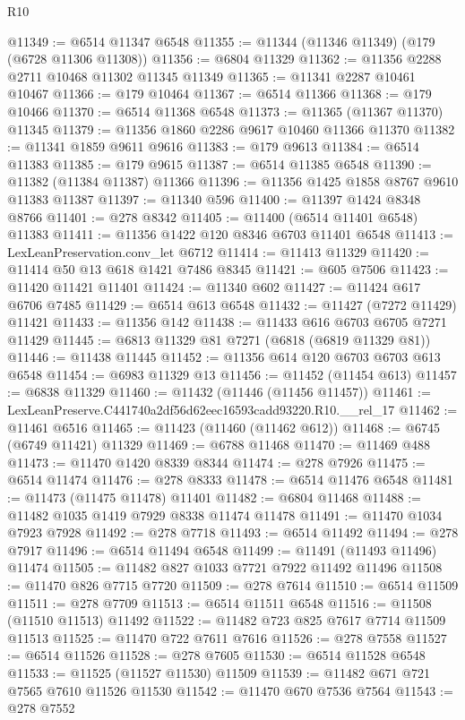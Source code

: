 \begin{lexlean}{R10}
\begin{coremodule}
@11349 := @6514 @11347 @6548
@11355 := @11344 (@11346 @11349) (@179 (@6728 @11306 @11308))
@11356 := @6804 @11329
@11362 := @11356 @2288 @2711 @10468 @11302 @11345 @11349
@11365 := @11341 @2287 @10461 @10467
@11366 := @179 @10464
@11367 := @6514 @11366
@11368 := @179 @10466
@11370 := @6514 @11368 @6548
@11373 := @11365 (@11367 @11370) @11345
@11379 := @11356 @1860 @2286 @9617 @10460 @11366 @11370
@11382 := @11341 @1859 @9611 @9616
@11383 := @179 @9613
@11384 := @6514 @11383
@11385 := @179 @9615
@11387 := @6514 @11385 @6548
@11390 := @11382 (@11384 @11387) @11366
@11396 := @11356 @1425 @1858 @8767 @9610 @11383 @11387
@11397 := @11340 @596
@11400 := @11397 @1424 @8348 @8766
@11401 := @278 @8342
@11405 := @11400 (@6514 @11401 @6548) @11383
@11411 := @11356 @1422 @120 @8346 @6703 @11401 @6548
@11413 := LexLeanPreservation.conv_let @6712
@11414 := @11413 @11329
@11420 := @11414 @50 @13 @618 @1421 @7486 @8345
@11421 := @605 @7506
@11423 := @11420 @11421 @11401
@11424 := @11340 @602
@11427 := @11424 @617 @6706 @7485
@11429 := @6514 @613 @6548
@11432 := @11427 (@7272 @11429) @11421
@11433 := @11356 @142
@11438 := @11433 @616 @6703 @6705 @7271 @11429
@11445 := @6813 @11329 @81 @7271 (@6818 (@6819 @11329 @81))
@11446 := @11438 @11445
@11452 := @11356 @614 @120 @6703 @6703 @613 @6548
@11454 := @6983 @11329 @13
@11456 := @11452 (@11454 @613)
@11457 := @6838 @11329
@11460 := @11432 (@11446 (@11456 @11457))
@11461 := LexLeanPreserve.C441740a2df56d62eec16593cadd93220.R10.__rel_17
@11462 := @11461 @6516
@11465 := @11423 (@11460 (@11462 @612))
@11468 := @6745 (@6749 @11421) @11329
@11469 := @6788 @11468
@11470 := @11469 @488
@11473 := @11470 @1420 @8339 @8344
@11474 := @278 @7926
@11475 := @6514 @11474
@11476 := @278 @8333
@11478 := @6514 @11476 @6548
@11481 := @11473 (@11475 @11478) @11401
@11482 := @6804 @11468
@11488 := @11482 @1035 @1419 @7929 @8338 @11474 @11478
@11491 := @11470 @1034 @7923 @7928
@11492 := @278 @7718
@11493 := @6514 @11492
@11494 := @278 @7917
@11496 := @6514 @11494 @6548
@11499 := @11491 (@11493 @11496) @11474
@11505 := @11482 @827 @1033 @7721 @7922 @11492 @11496
@11508 := @11470 @826 @7715 @7720
@11509 := @278 @7614
@11510 := @6514 @11509
@11511 := @278 @7709
@11513 := @6514 @11511 @6548
@11516 := @11508 (@11510 @11513) @11492
@11522 := @11482 @723 @825 @7617 @7714 @11509 @11513
@11525 := @11470 @722 @7611 @7616
@11526 := @278 @7558
@11527 := @6514 @11526
@11528 := @278 @7605
@11530 := @6514 @11528 @6548
@11533 := @11525 (@11527 @11530) @11509
@11539 := @11482 @671 @721 @7565 @7610 @11526 @11530
@11542 := @11470 @670 @7536 @7564
@11543 := @278 @7552

\end{coremodule}
\end{lexlean}
